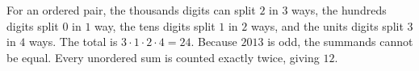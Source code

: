 For an ordered pair, the thousands digits can split $2$ in $3$ ways, the hundreds digits split $0$ in $1$ way, the tens digits split $1$ in $2$ ways, and the units digits split $3$ in $4$ ways. The total is $3\cdot1\cdot2\cdot4=24$. Because $2013$ is odd, the summands cannot be equal. Every unordered sum is counted exactly twice, giving $\boxed{12}$.
